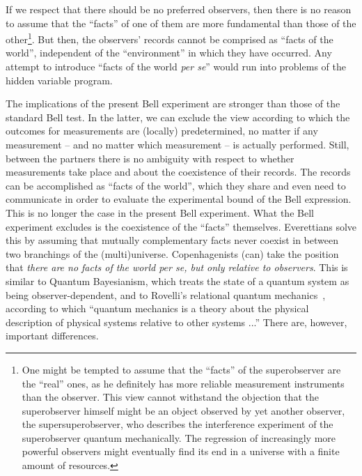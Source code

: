 \documentclass[12pt]{article}
\begin{document}
If we respect that there should be no preferred observers, then there is no reason to assume that the ``facts'' of one of them are more fundamental than those of the other\footnote{One might be tempted to assume that the ``facts'' of the superobserver are the ``real'' ones, as he definitely has more reliable measurement instruments than the observer. This view cannot withstand the objection that the superobserver himself might be an object observed by yet another observer, the supersuperobserver, who describes the interference experiment of the superobserver quantum mechanically. The regression of increasingly more powerful observers might eventually find its end in a universe with a finite amount of resources.}. But then, the observers' records cannot be comprised as ``facts of the world'', independent of the ``environment'' in which they have occurred. Any attempt to introduce ``facts of the world {\it per se}'' would run into problems of the hidden variable program. 

The implications of the present Bell experiment are stronger than those of the standard Bell test. In the latter, we can exclude the view according to which the outcomes for measurements are (locally) predetermined, no matter if any measurement -- and no matter which measurement -- is actually performed. Still, between the partners there is no ambiguity with respect to whether measurements take place and about the coexistence of their records. The records can be accomplished as ``facts of the world'', which they share and even need to communicate in order to evaluate the experimental bound of the Bell expression. This is no longer the case in the present Bell experiment. What the Bell experiment excludes is the coexistence of the ``facts'' themselves. Everettians solve this by assuming that mutually complementary facts never coexist in between two branchings of the (multi)universe. Copenhagenists (can) take the position that {\it there are no facts of the world per se, but only relative to observers}. This is similar to Quantum Bayesianism, which treats the state of a quantum system as being observer-dependent, and to Rovelli's relational quantum mechanics~\cite{rovelli}, according to which ``quantum mechanics is a theory about the physical description of physical systems relative to other systems ...'' There are, however, important differences.  
\end{document}

